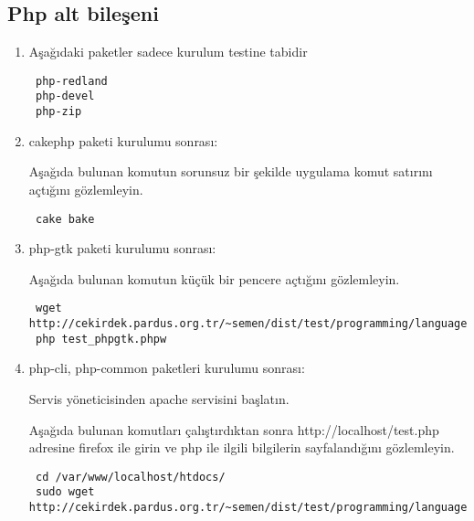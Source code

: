 \documentclass[a4paper,10pt]{article}
\begin{document}
\subsection{Php alt bileşeni}
\begin{enumerate}

\item Aşağıdaki paketler sadece kurulum testine tabidir
\begin{verbatim}
 php-redland
 php-devel
 php-zip
\end{verbatim}
\item cakephp paketi kurulumu sonrası:

Aşağıda bulunan komutun sorunsuz bir şekilde uygulama komut satırını açtığını gözlemleyin.
\begin{verbatim}
 cake bake
\end{verbatim}

\item php-gtk paketi kurulumu sonrası:

Aşağıda bulunan komutun küçük bir pencere açtığını gözlemleyin.
\begin{verbatim}
 wget http://cekirdek.pardus.org.tr/~semen/dist/test/programming/language/php/test_phpgtk.phpw
 php test_phpgtk.phpw
\end{verbatim}

\item php-cli, php-common paketleri kurulumu sonrası:

Servis yöneticisinden apache servisini başlatın.

Aşağıda bulunan komutları çalıştırdıktan sonra http://localhost/test.php adresine firefox ile girin ve php ile ilgili bilgilerin sayfalandığını gözlemleyin.

\begin{verbatim}
 cd /var/www/localhost/htdocs/
 sudo wget http://cekirdek.pardus.org.tr/~semen/dist/test/programming/language/php/test.php 
\end{verbatim}

\end{enumerate}
\end{document}

